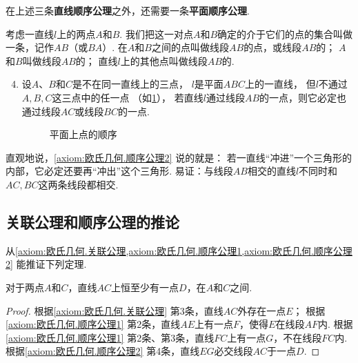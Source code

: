 在上述三条{\bf 直线顺序公理}之外，还需要一条{\bf 平面顺序公理}.

\begin{axiom}[顺序公理II]\label{axiom:欧氏几何.顺序公理2}
考虑一直线\(l\)上的两点\(A\)和\(B\).
我们把这一对点\(A\)和\(B\)确定的介于它们的点的集合叫做一条，记作\(AB\)（或\(BA\)）.
在\(A\)和\(B\)之间的点叫做线段\(AB\)的点，或线段\(AB\)的；
\(A\)和\(B\)叫做线段\(AB\)的；
直线\(l\)上的其他点叫做线段\(AB\)的.
\begin{enumerate}
	\setcounter{enumi}{3}
	\item 设\(A\)、\(B\)和\(C\)是不在同一直线上的三点，
	\(l\)是平面\(ABC\)上的一直线，
	但\(l\)不通过\(A,B,C\)这三点中的任一点
	（如\cref{figure:欧氏几何.平面上点的顺序1}），
	若直线\(l\)通过线段\(AB\)的一点，则它必定也通过线段\(AC\)或线段\(BC\)的一点.
	\begin{figure}[ht]
		\centering
		\caption{平面上点的顺序}
		\label{figure:欧氏几何.平面上点的顺序1}
	\end{figure}
\end{enumerate}
\end{axiom}
直观地说，\cref{axiom:欧氏几何.顺序公理2} 说的就是：
若一直线“冲进”一个三角形的内部，它必定还要再“冲出”这个三角形.
易证：与线段\(AB\)相交的直线\(l\)不同时和\(AC,BC\)这两条线段都相交.

\subsection{关联公理和顺序公理的推论}
从\cref{axiom:欧氏几何.关联公理,axiom:欧氏几何.顺序公理1,axiom:欧氏几何.顺序公理2} 能推证下列定理.
\begin{theorem}\label{theorem:欧氏几何.定理3}
对于两点\(A\)和\(C\)，直线\(AC\)上恒至少有一点\(D\)，在\(A\)和\(C\)之间.
\begin{proof}
根据\cref{axiom:欧氏几何.关联公理} 第3条，直线\(AC\)外存在一点\(E\)；
根据\cref{axiom:欧氏几何.顺序公理1} 第2条，直线\(AE\)上有一点\(F\)，使得\(E\)在线段\(AF\)内.
根据\cref{axiom:欧氏几何.顺序公理1} 第2条、第3条，直线\(FC\)上有一点\(G\)，不在线段\(FC\)内.
根据\cref{axiom:欧氏几何.顺序公理2} 第4条，直线\(EG\)必交线段\(AC\)于一点\(D\).
\end{proof}
\end{theorem}

